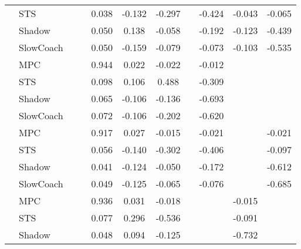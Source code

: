 \begin{tabular}{|l|l|*{9}{c|}}
                                                           & STS &       &        &     0.038 & -0.132 & -0.297 &     &  -0.424 &  -0.043 &   -0.065 \\
                                                           & Shadow &       &        &     0.050 &  0.138 & -0.058 &     &  -0.192 &  -0.123 &   -0.439 \\
                                                           & SlowCoach &       &        &     0.050 & -0.159 & -0.079 &     &  -0.073 &  -0.103 &   -0.535 \\
\midrule
[False, False, True, True, True, False, True, False, False] & MPC &       &        &     0.944 &  0.022 & -0.022 &     &  -0.012 &      &       \\
                                                           & STS &       &        &     0.098 &  0.106 &  0.488 &     &  -0.309 &      &       \\
                                                           & Shadow &       &        &     0.065 & -0.106 & -0.136 &     &  -0.693 &      &       \\
                                                           & SlowCoach &       &        &     0.072 & -0.106 & -0.202 &     &  -0.620 &      &       \\
\midrule
[False, False, True, True, True, False, True, False, True] & MPC &       &        &     0.917 &  0.027 & -0.015 &     &  -0.021 &      &   -0.021 \\
                                                           & STS &       &        &     0.056 & -0.140 & -0.302 &     &  -0.406 &      &   -0.097 \\
                                                           & Shadow &       &        &     0.041 & -0.124 & -0.050 &     &  -0.172 &      &   -0.612 \\
                                                           & SlowCoach &       &        &     0.049 & -0.125 & -0.065 &     &  -0.076 &      &   -0.685 \\
\midrule
[False, False, True, True, True, False, False, True, False] & MPC &       &        &     0.936 &  0.031 & -0.018 &     &      &  -0.015 &       \\
                                                           & STS &       &        &     0.077 &  0.296 & -0.536 &     &      &  -0.091 &       \\
                                                           & Shadow &       &        &     0.048 &  0.094 & -0.125 &     &      &  -0.732 &       \\

\end{tabular}
